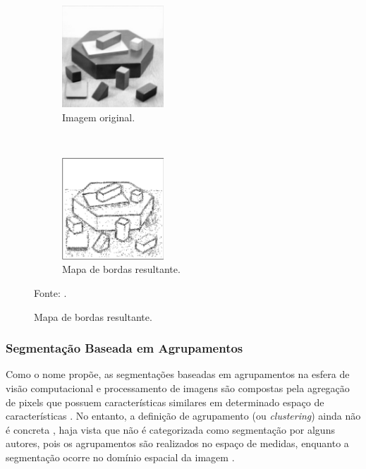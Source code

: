 \begin{figure}[H]
   \caption{Segmentação com operador Laplaciano.}
   \centering
   \label{segment:fig:8}
    \begin{subfigure}[t]{0.45\textwidth}
        \centering
        \includegraphics[height=1.5in]{recursos/imagens/image_seg/ol1.png}
        \caption{Imagem original.}
        \label{segment:fig:8.1}
    \end{subfigure}%
    ~ 
    \begin{subfigure}[t]{0.45\textwidth}
        \centering
        \includegraphics[height=1.5in]{recursos/imagens/image_seg/lp2.png}
        \caption{Mapa de bordas resultante.}
        \label{segment:fig:8.2}
    \end{subfigure}%

    \vspace*{1 cm}
    Fonte: \cite{pedrini2008analise}.
\end{figure}

\subsubsection{Segmentação Baseada em Agrupamentos}
\label{segment:group}

Como o nome propõe, as segmentações baseadas em agrupamentos na esfera de visão computacional e processamento de imagens são compostas pela agregação de pixels que possuem características similares em determinado espaço de características \cite{Yuheng2017}. No entanto, a definição de agrupamento (ou \textit{clustering}) ainda não é concreta \cite{Yuheng2017}, haja vista que não é categorizada como segmentação por alguns autores, pois os agrupamentos são realizados no espaço de medidas, enquanto a segmentação ocorre no domínio espacial da imagem \cite{Haralick1985}.

